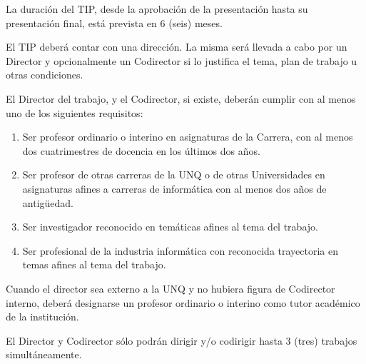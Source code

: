 \articulo La duración del TIP, desde la aprobación de la presentación hasta
su presentación final, está prevista en 6 (seis) meses. 


\articulo El TIP deberá contar con una dirección. La misma será llevada a
cabo por un Director y opcionalmente un Codirector si lo justifica el tema, plan de
trabajo u otras condiciones.

\articulo El Director del trabajo, y el Codirector, si existe,
deberán cumplir con al menos uno de los siguientes requisitos:
\begin{enumerate}
\item Ser profesor ordinario o interino en asignaturas de la Carrera, con al
menos dos cuatrimestres de docencia en los últimos dos años.
\item Ser profesor de otras carreras de la UNQ o de otras Universidades en
asignaturas afines a carreras de informática con al menos dos años de
antigüedad.
\item Ser investigador reconocido en temáticas afines al tema del trabajo.
\item Ser profesional de la industria informática con reconocida trayectoria en
temas afines al tema del trabajo.
\end{enumerate}

\articulo Cuando el director sea externo a la UNQ y no hubiera figura de
Codirector interno, deberá designarse un profesor ordinario o interino como tutor
académico de la institución. 

\articulo El Director y Codirector sólo podrán dirigir y/o codirigir hasta 3
(tres) trabajos simultáneamente. 

